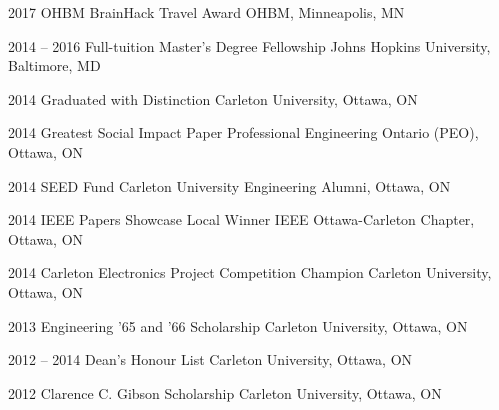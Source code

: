 \documentclass[]{friggeri-cv} %
\begin{document}
\begin{entrylist}
\vspace{-7pt}
\entry
{2017}
{OHBM BrainHack Travel Award}
{OHBM, Minneapolis, MN}
{}
\vspace{-7pt}

\entry
{2014 -- 2016}
{Full-tuition Master's Degree Fellowship}
{Johns Hopkins University, Baltimore, MD}
{}
\vspace{-7pt}

\entry
{2014}
{Graduated with Distinction}
{Carleton University, Ottawa, ON}
{}
\vspace{-7pt}

\entry
{2014}
{Greatest Social Impact Paper}
{Professional Engineering Ontario (PEO), Ottawa, ON}
{}
\vspace{-7pt}

\entry
{2014}
{SEED Fund}
{Carleton University Engineering Alumni, Ottawa, ON}
{}
\vspace{-7pt}

\entry
{2014}
{IEEE Papers Showcase Local Winner}
{IEEE Ottawa-Carleton Chapter, Ottawa, ON}
{}
\vspace{-7pt}

\entry
{2014}
{Carleton Electronics Project Competition Champion}
{Carleton University, Ottawa, ON}
{}
\vspace{-7pt}

\entry
{2013}
{Engineering '65 and '66 Scholarship}
{Carleton University, Ottawa, ON}
{}
\vspace{-7pt}

\entry
{2012 -- 2014}
{Dean's Honour List}
{Carleton University, Ottawa, ON}
{}
\vspace{-7pt}

\entry
{2012}
{Clarence C. Gibson Scholarship}
{Carleton University, Ottawa, ON}
{}
\vspace{-7pt}
\end{entrylist}
\end{document}
